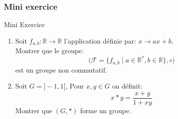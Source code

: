 \documentclass{beamer}
\begin{document}
\begin{frame}[t]
  \frametitle{Mini exercice}
 \begin{block}{Mini Exercice}
   \small
   \begin{enumerate}
     \item Soit $f_{a,b}: \mathbb{R}\rightarrow \mathbb{R}$ l'application
       définie par: $x\rightarrow ax+b$.\\
       Montrer que le groupe:
       \begin{equation}
         \Big(\mathcal{F}=\{f_{a,b}\;|\; a\in\mathbb{R}^{*}, b\in\mathbb{R}\},
         \circ\Big)
       \end{equation}
       est un groupe non commutatif.
      \item Soit $G = ]-1, 1[$, Pour $x,y \in G$ on définit:
        \begin{equation}
          x*y = \dfrac{x+y}{1 + xy}
        \end{equation}
        Montrer que $\left(G, *\right)$ forme un groupe.
   \end{enumerate}
 \end{block} 
\end{frame}
\end{document}
